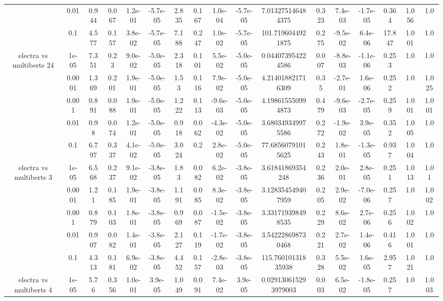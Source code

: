 \begin{tabular}{|c|c|c|c|c|c|c|c|c|c|c|c|c|c|c|c|c|}
 & 0.01 & 0.944 & 0.067 & 1.2e-01 & -5.7e-05 & 2.835 & 0.167 & 1.0e-04 & -5.7e-05 & 7.013275146484375 & 0.323 & 7.4e-03 & -1.7e-05 & 0.364 & 1.056 & 1.0 \\
 & 0.1 & 4.577 & 0.157 & 3.8e-02 & -5.7e-05 & 7.188 & 0.247 & 1.0e-02 & -5.7e-05 & 101.7196044921875 & 0.275 & -9.5e-02 & 6.4e-06 & 17.847 & 1.001 & 1.0 \\
\hline
\multirow{5}{*}{electra  vs multiberts 24} & 1e-05 & 7.351 & 0.23 & 9.0e-02 & -5.0e-05 & 2.318 & 0.101 & 5.5e-02 & -5.0e-05 & 0.044073954224586 & 0.007 & -8.8e-03 & -1.1e-06 & 0.253 & 1.0 & 1.0 \\
 & 0.0001 & 1.369 & 0.201 & 1.9e-01 & -5.0e-05 & 1.53 & 0.116 & 7.9e-02 & -5.0e-05 & 4.214018821716309 & 0.35 & -2.7e-01 & 1.6e-06 & 0.252 & 1.0 & 1.025 \\
 & 0.001 & 0.891 & 0.088 & 1.9e-01 & -5.0e-05 & 1.222 & 0.113 & -9.6e-03 & -5.0e-05 & 4.198615550994873 & 0.479 & -9.6e-03 & -2.7e-05 & 0.259 & 1.001 & 1.001 \\
 & 0.01 & 0.98 & 0.074 & 1.2e-01 & -5.0e-05 & 0.918 & 0.062 & -4.3e-02 & -5.0e-05 & 3.680349349975586 & 0.272 & -1.9e-02 & 3.9e-05 & 0.352 & 1.005 & 1.0 \\
 & 0.1 & 6.797 & 0.337 & 4.1e-02 & -5.0e-05 & 3.024 & 0.2 & 2.8e-02 & -5.0e-05 & 77.68560791015625 & 0.243 & 1.8e-01 & -1.3e-05 & 0.937 & 1.004 & 1.0 \\
\hline
\multirow{5}{*}{electra  vs multiberts 3} & 1e-05 & 6.568 & 0.237 & 9.1e-02 & -3.8e-05 & 1.83 & 0.082 & 6.2e-02 & -3.8e-05 & 3.61841869354248 & 0.236 & 2.0e-01 & 2.8e-05 & 0.251 & 1.013 & 1.01 \\
 & 0.0001 & 1.21 & 0.185 & 1.9e-01 & -3.8e-05 & 1.191 & 0.085 & 8.3e-02 & -3.8e-05 & 3.128354549407959 & 0.205 & 2.9e-02 & -7.0e-06 & 0.257 & 1.0 & 1.002 \\
 & 0.001 & 0.879 & 0.103 & 1.8e-01 & -3.8e-05 & 0.969 & 0.087 & -1.5e-02 & -3.8e-05 & 3.331719398498535 & 0.229 & 8.6e-02 & 2.7e-06 & 0.256 & 1.002 & 1.0 \\
 & 0.01 & 0.907 & 0.082 & 1.4e-01 & -3.8e-05 & 2.127 & 0.119 & -1.7e-02 & -3.8e-05 & 3.542228698730468 & 0.221 & 2.7e-02 & 1.4e-06 & 0.416 & 1.001 & 1.0 \\
 & 0.1 & 4.313 & 0.181 & 6.9e-02 & -3.8e-05 & 4.452 & 0.157 & -2.8e-03 & -3.8e-05 & 115.76010131835938 & 0.328 & 5.5e-02 & 1.6e-05 & 2.957 & 1.021 & 1.0 \\
\hline
\multirow{5}{*}{electra  vs multiberts 4} & 1e-05 & 5.76 & 0.356 & 1.0e-01 & 3.9e-05 & 1.049 & 0.091 & 7.4e-02 & 3.9e-05 & 0.029130615293979003 & 0.003 & 6.5e-02 & -1.8e-05 & 0.257 & 1.0 & 1.003 \\

\end{tabular}
